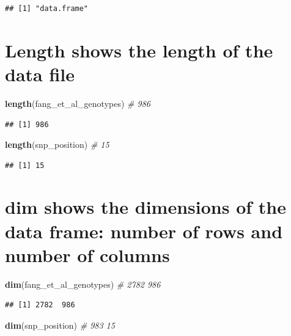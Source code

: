 \documentclass[
]{article}
\newenvironment{Shaded}{\begin{snugshade}}{\end{snugshade}}
\newcommand{\CommentTok}[1]{\textcolor[rgb]{0.56,0.35,0.01}{\textit{#1}}}
\newcommand{\FunctionTok}[1]{\textcolor[rgb]{0.13,0.29,0.53}{\textbf{#1}}}
\newcommand{\NormalTok}[1]{#1}
\begin{document}
\begin{verbatim}
## [1] "data.frame"
\end{verbatim}

\section{Length shows the length of the data
file}\label{length-shows-the-length-of-the-data-file}

\begin{Shaded}
\begin{Highlighting}[]
\FunctionTok{length}\NormalTok{(fang\_et\_al\_genotypes) }\CommentTok{\# 986}
\end{Highlighting}
\end{Shaded}

\begin{verbatim}
## [1] 986
\end{verbatim}

\begin{Shaded}
\begin{Highlighting}[]
\FunctionTok{length}\NormalTok{(snp\_position) }\CommentTok{\# 15}
\end{Highlighting}
\end{Shaded}

\begin{verbatim}
## [1] 15
\end{verbatim}

\section{dim shows the dimensions of the data frame: number of rows and
number of
columns}\label{dim-shows-the-dimensions-of-the-data-frame-number-of-rows-and-number-of-columns}

\begin{Shaded}
\begin{Highlighting}[]
\FunctionTok{dim}\NormalTok{(fang\_et\_al\_genotypes) }\CommentTok{\# 2782 986}
\end{Highlighting}
\end{Shaded}

\begin{verbatim}
## [1] 2782  986
\end{verbatim}

\begin{Shaded}
\begin{Highlighting}[]
\FunctionTok{dim}\NormalTok{(snp\_position) }\CommentTok{\# 983 15}
\end{Highlighting}
\end{Shaded}
\end{document}
